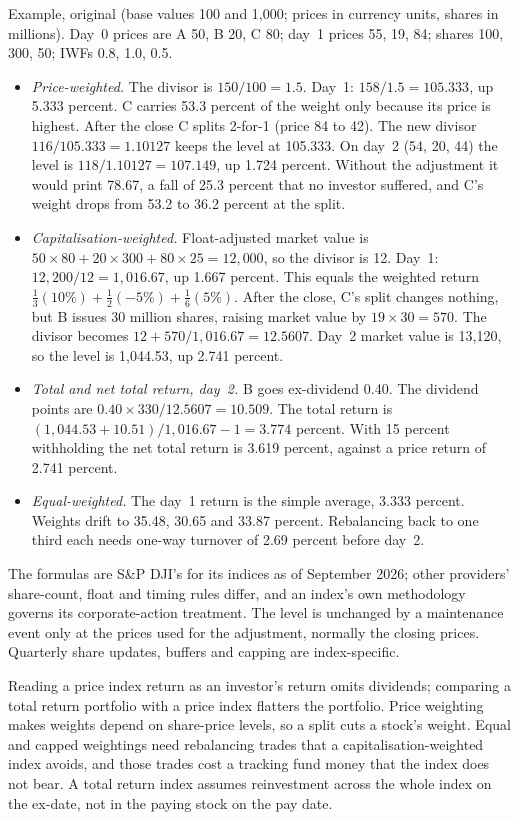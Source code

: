 \begin{qfmethod}
 Example, original (base values 100 and 1{,}000; prices in currency units, shares in millions). Day~0 prices are A 50, B 20, C 80; day~1 prices 55, 19, 84; shares 100, 300, 50; IWFs 0.8, 1.0, 0.5.
\begin{itemize}
\item \emph{Price-weighted.} The divisor is $150/100=1.5$. Day~1: $158/1.5=105.333$, up 5.333 percent. C carries 53.3 percent of the weight only because its price is highest. After the close C splits 2-for-1 (price 84 to 42). The new divisor $116/105.333=1.10127$ keeps the level at 105.333. On day~2 (54, 20, 44) the level is $118/1.10127=107.149$, up 1.724 percent. Without the adjustment it would print 78.67, a fall of 25.3 percent that no investor suffered, and C's weight drops from 53.2 to 36.2 percent at the split.
\item \emph{Capitalisation-weighted.} Float-adjusted market value is $50\times80+20\times300+80\times25=12{,}000$, so the divisor is 12. Day~1: $12{,}200/12=1{,}016.67$, up 1.667 percent. This equals the weighted return $\tfrac13(10\%)+\tfrac12(-5\%)+\tfrac16(5\%)$. After the close, C's split changes nothing, but B issues 30 million shares, raising market value by $19\times30=570$. The divisor becomes $12+570/1{,}016.67=12.5607$. Day~2 market value is 13{,}120, so the level is 1{,}044.53, up 2.741 percent.
\item \emph{Total and net total return, day~2.} B goes ex-dividend 0.40. The dividend points are $0.40\times330/12.5607=10.509$. The total return is $(1{,}044.53+10.51)/1{,}016.67-1=3.774$ percent. With 15 percent withholding the net total return is 3.619 percent, against a price return of 2.741 percent.
\item \emph{Equal-weighted.} The day~1 return is the simple average, 3.333 percent. Weights drift to 35.48, 30.65 and 33.87 percent. Rebalancing back to one third each needs one-way turnover of 2.69 percent before day~2.
\end{itemize}

 The formulas are S\&P DJI's for its indices as of September 2026; other providers' share-count, float and timing rules differ, and an index's own methodology governs its corporate-action treatment. The level is unchanged by a maintenance event only at the prices used for the adjustment, normally the closing prices. Quarterly share updates, buffers and capping are index-specific.

 Reading a price index return as an investor's return omits dividends; comparing a total return portfolio with a price index flatters the portfolio. Price weighting makes weights depend on share-price levels, so a split cuts a stock's weight. Equal and capped weightings need rebalancing trades that a capitalisation-weighted index avoids, and those trades cost a tracking fund money that the index does not bear. A total return index assumes reinvestment across the whole index on the ex-date, not in the paying stock on the pay date.


\end{qfmethod}
